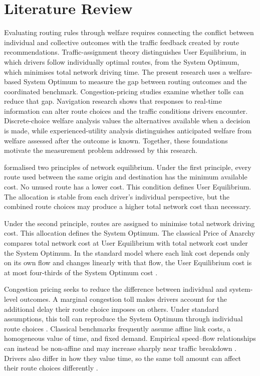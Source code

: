 \documentclass{article}
\begin{document}
\clearpage
\section{Literature Review}

Evaluating routing rules through welfare requires connecting the conflict between individual and collective outcomes with the traffic feedback created by route recommendations. Traffic-assignment theory distinguishes User Equilibrium, in which drivers follow individually optimal routes, from the System Optimum, which minimises total network driving time. The present research uses a welfare-based System Optimum to measure the gap between routing outcomes and the coordinated benchmark. Congestion-pricing studies examine whether tolls can reduce that gap. Navigation research shows that responses to real-time information can alter route choices and the traffic conditions drivers encounter. Discrete-choice welfare analysis values the alternatives available when a decision is made, while experienced-utility analysis distinguishes anticipated welfare from welfare assessed after the outcome is known. Together, these foundations motivate the measurement problem addressed by this research.

\Textcite{wardrop1952} formalised two principles of network equilibrium. Under the first principle, every route used between the same origin and destination has the minimum available cost. No unused route has a lower cost. This condition defines User Equilibrium. The allocation is stable from each driver's individual perspective, but the combined route choices may produce a higher total network cost than necessary.

Under the second principle, routes are assigned to minimise total network driving cost. This allocation defines the System Optimum. The classical Price of Anarchy compares total network cost at User Equilibrium with total network cost under the System Optimum. In the standard model where each link cost depends only on its own flow and changes linearly with that flow, the User Equilibrium cost is at most four-thirds of the System Optimum cost \parencite{roughgardenTardos2002}.

Congestion pricing seeks to reduce the difference between individual and system-level outcomes. A marginal congestion toll makes drivers account for the additional delay their route choice imposes on others. Under standard assumptions, this toll can reproduce the System Optimum through individual route choices \parencite{pigou1920,rouwendalVerhoef2006}. Classical benchmarks frequently assume affine link costs, a homogeneous value of time, and fixed demand. Empirical speed--flow relationships can instead be non-affine and may increase sharply near traffic breakdown \parencite{vanAerdeYagar1983,vanAerdeRakha1995}. Drivers also differ in how they value time, so the same toll amount can affect their route choices differently \parencite{wardmanEtAl2016,kosterEtAl2018}.
\end{document}

